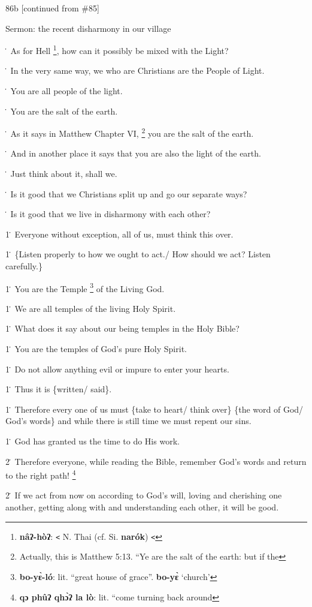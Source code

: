 
86b [continued from \#85]

Sermon: the recent disharmony in our village

\. As for Hell \footnote{\textbf{nâʔ-hòʔ}: \texttt{<} N. Thai (cf. Si. \textbf{narók}) \texttt{<}}, how can it possibly be mixed with the Light?

\. In the very same way, we who are Christians are the People of Light.

\. You are all people of the light.

\. You are the salt of the earth.

\. As it says in Matthew Chapter VI, \footnote{Actually, this is Matthew 5:13. ``Ye are the salt of the earth: but if the} you are the salt of the earth.

\. And in another place it says that you are also the light of the earth.

\. Just think about it, shall we.

\. Is it good that we Christians split up and go our separate ways?

\. Is it good that we live in disharmony with each other?

1\. Everyone without exception, all of us, must think this over.

1\. \{Listen properly to how we ought to act./ How should we act? Listen carefully.\}

1\. You are the Temple \footnote{\textbf{bo-yɛ̀-ló}: lit. ``great house of grace''. \textbf{bo-yɛ̀} `church'} of the Living God.

1\. We are all temples of the living Holy Spirit.

1\. What does it say about our being temples in the Holy Bible?

1\. You are the temples of God's pure Holy Spirit.

1\. Do not allow anything evil or impure to enter your hearts.

1\. Thus it is \{written/ said\}.

1\. Therefore every one of us must \{take to heart/ think over\} \{the word of
God/ God's words\} and while there is still time we must repent our sins.

1\. God has granted us the time to do His work.

2\. Therefore everyone, while reading the Bible, remember God's words and return
to the right path! \footnote{\textbf{qɔ   phûʔ   qhɔ̀ʔ  la  lò}: lit. ``come turning back around}

2\. If we act from now on according to God's will, loving and cherishing one another,
getting along with and understanding each other, it will be good.


